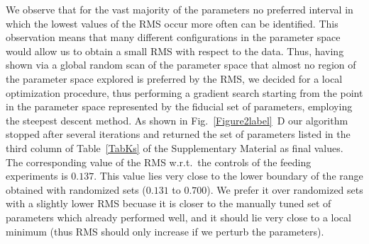 \documentclass[oneside, 10pt, a4paper, twocolumn]{article}
\begin{document}
We observe that for the vast majority of the parameters no preferred interval in which the lowest values of the RMS occur more often can be identified. %
This observation means that many different configurations in the parameter space would allow us to obtain a small RMS with respect to the data. %
Thus, having shown via a global random scan of the parameter space that almost no region of the parameter space explored is preferred by the RMS, we decided for a local optimization procedure, thus performing a gradient search starting from the point in the parameter space represented by the fiducial set of parameters, 
employing the steepest descent method. 
As shown in Fig.~\ref{Figure2label}~D our algorithm stopped after several iterations and returned the set of parameters listed in the third column of Table~\ref{TabKs} of the Supplementary Material as final values. The corresponding value of the RMS w.r.t.~the controls of the feeding experiments is $0.137$. This value lies very close to the lower boundary of the range obtained with randomized sets ($0.131$ to $0.700$). We prefer it over randomized sets with a slightly lower RMS becuase it is closer to the manually tuned set of parameters which already performed well, and it should lie very close to a local minimum (thus RMS should only increase if we perturb the parameters).
\end{document}
